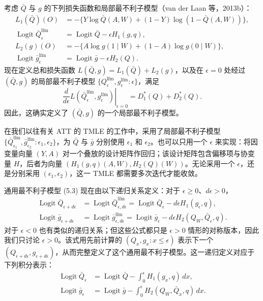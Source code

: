 考虑 $\bar Q$ 与 $g$ 的下列损失函数和局部最不利子模型（van der Laan 等，2013b）：
\[
 \begin{aligned}
 L_1(\bar Q)(O)&=-\{Y\log\bar Q(A,W)
 +(1-Y)\log(1-\bar Q(A,W))\},\\
 \operatorname{Logit}\bar Q_\epsilon^{\mathrm{lfm}}
 &=\operatorname{Logit}\bar Q-\epsilon H_1(g,q),\\
 L_2(g)(O)&=-\{A\log g(1\mid W)+(1-A)\log g(0\mid W)\},\\
 \operatorname{Logit}\bar g_\epsilon^{\mathrm{lfm}}
 &=\operatorname{Logit}\bar g-\epsilon H_2(Q).
 \end{aligned}
\]
现在定义总和损失函数 $L(\bar Q,g)=L_1(\bar Q)+L_2(g)$，以及在 $\epsilon=0$ 处经过 $(\bar Q,g)$ 的局部最不利子模型 $\{Q_\epsilon^{\mathrm{lfm}},g_\epsilon^{\mathrm{lfm}}:\epsilon\}$，满足
\[
 \left.\frac{d}{d\epsilon}
 L(\bar Q_\epsilon^{\mathrm{lfm}},g_\epsilon^{\mathrm{lfm}})
 \right|_{\epsilon=0}=D_1^*(Q)+D_2^*(Q).
\]
因此，这确实定义了 $(\bar Q,g)$ 的一个局部最不利子模型。

在我们以往有关 ATT 的 TMLE 的工作中，采用了局部最不利子模型
$\{\bar Q_{\epsilon_1}^{\mathrm{lfm}},\bar g_{\epsilon_2}^{\mathrm{lfm}}:\epsilon_1,\epsilon_2\}$，为 $\bar Q$ 与 $\bar g$ 分别使用 $\epsilon_1$ 和 $\epsilon_2$。也可以只用一个 $\epsilon$ 来实现：将因变量向量 $(Y,A)$ 对一个叠放的设计矩阵作回归；该设计矩阵包含偏移项与协变量 $H$，后者为向量 $(H_1(g,q)(A,W),H_2(Q)(W))$。无论采用一个 $\epsilon$，还是分别采用 $(\epsilon_1,\epsilon_2)$，这一 TMLE 都需要多次迭代才能收敛。

通用最不利子模型 (5.3) 现在由以下递归关系定义：对于 $\epsilon\geq0$、$d\epsilon>0$，
\[
 \begin{aligned}
 \operatorname{Logit}\bar Q_{\epsilon+d\epsilon}
 &=\operatorname{Logit}\bar Q_{\epsilon,d\epsilon}^{\mathrm{lfm}}
 =\operatorname{Logit}\bar Q_\epsilon-d\epsilon H_1(g_\epsilon,q),\\
 \operatorname{Logit}\bar g_{\epsilon+d\epsilon}
 &=\operatorname{Logit}\bar g_{\epsilon,d\epsilon}^{\mathrm{lfm}}
 =\operatorname{Logit}\bar g_\epsilon
 -d\epsilon H_2(Q_W,\bar Q_\epsilon,q).
 \end{aligned}
\]
对于 $\epsilon<0$ 也有类似的递归关系；但这些公式都只是 $\epsilon>0$ 情形的对称版本，因此我们只讨论 $\epsilon>0$。该式用先前计算的 $(Q_x,g_x:x\leq\epsilon)$ 表示下一个 $(Q_{\epsilon+d\epsilon},g_{\epsilon+d\epsilon})$，从而完整定义了这个通用最不利子模型。这一递归定义对应于下列积分表示：
\[
 \begin{aligned}
 \operatorname{Logit}\bar Q_\epsilon
 &=\operatorname{Logit}\bar Q-\int_0^\epsilon H_1(g_x,q)\,dx,\\
 \operatorname{Logit}\bar g_\epsilon
 &=\operatorname{Logit}\bar g-\int_0^\epsilon H_2(Q_W,\bar Q_x,q)\,dx.
 \end{aligned}
\]


